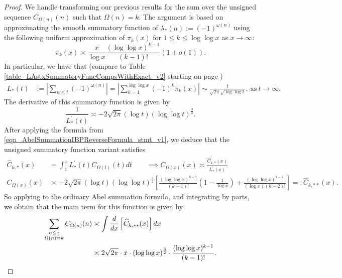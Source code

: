 \documentclass[11pt,reqno,a4letter]{article}
\numberwithin{figure}{section}
\numberwithin{table}{section}
\theoremstyle{plain}
\numberwithin{theorem}{section}
\theoremstyle{definition}
\begin{document}
\begin{proof}
We handle transforming our previous results for the sum over the unsigned sequence 
$C_{\Omega(n)}(n)$ such that $\Omega(n) = k$. 
The argument is based on approximating the smooth summatory function of 
$\lambda_{\ast}(n) := (-1)^{\omega(n)}$ using the following 
uniform approximation of $\pi_k(x)$ for $1 \leq k \leq \log\log x$ as 
$x \rightarrow \infty$: 
\[
\pi_k(x) \asymp \frac{x}{\log x} \frac{(\log\log x)^{k-1}}{(k-1)!} (1 + o(1)). 
\]
In particular, we have that 
(compare to Table \ref{table_LAstxSummatoryFuncCompsWithExact_v2} starting on page 
\pageref{table_LAstxSummatoryFuncCompsWithExact_v2}) 
\begin{align*} 
L_{\ast}(t) & := \left\lvert \sum_{n \leq t} (-1)^{\omega(n)} \right\rvert = 
     \left\lvert \sum_{k=1}^{\log\log x} (-1)^{k} \pi_k(x) \right\rvert \sim 
     \frac{t}{\sqrt{2\pi} \sqrt{\log\log t}}, \mathrm{\ as\ } t \rightarrow \infty. 
\end{align*} 
The derivative of this summatory function is given by 
\[
\frac{1}{L_{\ast}^{\prime}(t)} \asymp -2\sqrt{2\pi} (\log t) (\log\log t)^{\frac{3}{2}}. 
\]
After applying the formula from \eqref{eqn_AbelSummationIBPReverseFormula_stmt_v1},  
we deduce that the unsigned summatory function variant satisfies 
\begin{align*} 
\widehat{C}_{k,\ast}(x) & = \int_1^{x} L_{\ast}^{\prime}(t) C_{\Omega(t)}(t) dt \qquad \implies 
C_{\Omega(x)}(x) \asymp \frac{\widehat{C}_{k,\ast}^{\prime}(x)}{L_{\ast}^{\prime}(x)} \\ 
C_{\Omega(x)}(x) & \asymp -2\sqrt{2\pi} (\log t) (\log\log t)^{\frac{3}{2}} 
     \left[\frac{(\log\log x)^{k-1}}{(k-1)!} \left(1 - 
     \frac{1}{\log x}\right) + \frac{(\log\log x)^{k-2}}{(\log x) (k-2)!}\right] 
     =: \widehat{C}_{k,\ast\ast}(x). 
\end{align*} 
So applying to the ordinary Abel summation formula, and integrating by parts, we obtain that 
the main term for this function is given by 
\begin{align*} 
\sum_{\substack{n \leq x \\ \Omega(n)=k}} C_{\Omega(n)}(n) & \asymp 
     \int \frac{d}{dx}\left[\widehat{C}_{k,\ast\ast}(x)\right] dx \\ 
     & \asymp 2\sqrt{2\pi} \cdot x \cdot (\log\log x)^{\frac{3}{2}} \cdot 
     \frac{(\log\log x)^{k-1}}{(k-1)!}. 
     \qedhere 
\end{align*} 
\end{proof}
\end{document}
